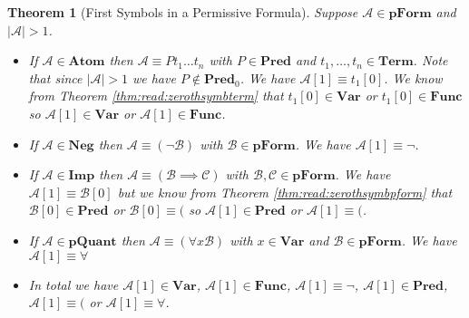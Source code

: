 \documentclass[12pt]{article}
\theoremstyle{break}
\theoremstyle{break}
\newtheorem{theorem}{Theorem}[section]
\theoremstyle{break}
\theoremstyle{break}
\theoremstyle{break}
\newtheorem{informal definition}[definition]{Informal Definition}
\newcommand{\mc}[1]{\mathcal{#1}}
\begin{document}
\begin{theorem}[First Symbols in a Permissive Formula]
\label{thm:read:firstsymbpform}
Suppose $\mc{A}\in\textbf{pForm}$ and $|\mc{A}|>1$.
\begin{itemize}
\item{If $\mc{A}\in\textbf{Atom}$ then $\mc{A}\equiv Pt_1\ldots t_n$ with $P\in\textbf{Pred}$ and $t_1,\ldots,t_n\in\textbf{Term}$.
Note that since $|\mc{A}|>1$ we have $P\not \in \textbf{Pred}_0$. We have $\mc{A}[1] \equiv t_1[0]$. We know from Theorem \ref{thm:read:zerothsymbterm} that $t_1[0] \in \textbf{Var}$ or $t_1[0] \in \textbf{Func}$ so $\mc{A}[1]\in \textbf{Var}$ or $\mc{A}[1] \in \textbf{Func}$.}
\item{If $\mc{A}\in\textbf{Neg}$ then $\mc{A} \equiv (\lnot \mc{B})$ with $\mc{B}\in\textbf{pForm}$. We have $\mc{A}[1] \equiv \lnot$.}
\item{If $\mc{A}\in\textbf{Imp}$ then $\mc{A}\equiv (\mc{B} \implies \mc{C})$ with $\mc{B}, \mc{C}\in\textbf{pForm}$. We have $\mc{A}[1] \equiv \mc{B}[0]$ but we know from Theorem \ref{thm:read:zerothsymbpform} that $\mc{B}[0] \in \textbf{Pred}$ or $\mc{B}[0] \equiv ($ so $\mc{A}[1]\in\textbf{Pred}$ or $\mc{A}[1] \equiv ($.}
\item{If $\mc{A} \in \textbf{pQuant}$ then $\mc{A} \equiv (\forall x \mc{B})$ with $x\in \textbf{Var}$ and $\mc{B}\in\textbf{pForm}$. We have $\mc{A}[1] \equiv \forall$}
\item{In total we have $\mc{A}[1] \in \textbf{Var}$, $\mc{A}[1]\in\textbf{Func}$, $\mc{A}[1] \equiv \lnot$, $\mc{A}[1]\in\textbf{Pred}$, $\mc{A}[1]\equiv ($ or $\mc{A}[1] \equiv \forall$.}
\end{itemize}
\end{theorem}
\end{document}
